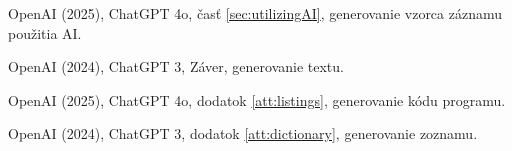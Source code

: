 \begin{trivlist}
\item OpenAI (2025), ChatGPT 4o, časť \ref{sec:utilizingAI}, generovanie vzorca záznamu použitia AI.

\item OpenAI (2024), ChatGPT 3, Záver, generovanie textu.

\item OpenAI (2025), ChatGPT 4o, dodatok \ref{att:listings}, generovanie kódu programu.

\item OpenAI (2024), ChatGPT 3, dodatok \ref{att:dictionary}, generovanie zoznamu.
\end{trivlist}
